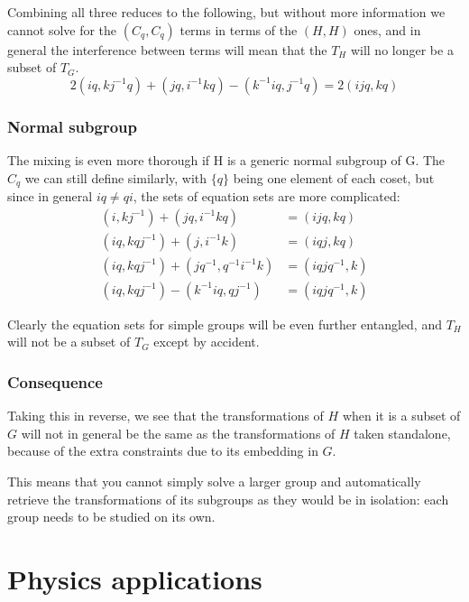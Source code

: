 \documentclass{revtex4-1}
\begin{document}
Combining all three reduces to the following, but without more information we cannot solve for
the $(C_q,C_q)$ terms in terms of the $(H,H)$ ones, and in general the interference between terms
will mean that the $T_H$ will no longer be a subset of $T_G$.
\begin{equation}
2(iq,kj^{-1}q) + (jq,i^{-1}kq) - (k^{-1}iq,j^{-1}q) = 2(ijq,kq)
\end{equation}

\subsubsection{Normal subgroup}

The mixing is even more thorough if H is a generic normal subgroup of G.  The $C_q$ we can still
define similarly, with $\{q\}$ being one element of each coset, but since in general $iq \neq qi$,
the sets of equation sets are more complicated:
\begin{align}
(i,kj^{-1}) + (jq, i^{-1}kq) &= (ijq, kq) \\ 
(iq,kqj^{-1}) + (j, i^{-1}k) &= (iqj, kq) \\
(iq,kqj^{-1}) + (jq^{-1}, q^{-1}i^{-1}k) &= (iqjq^{-1},k) \nonumber \\
(iq,kqj^{-1}) - (k^{-1}iq,qj^{-1}) &= (iqjq^{-1},k)
\end{align}

Clearly the equation sets for simple groups will be even further entangled, and $T_H$ will not
be a subset of $T_G$ except by accident.

\subsubsection{Consequence}

Taking this in reverse, we see that the transformations of $H$ when it is a subset of $G$ will
not in general be the same as the transformations of $H$ taken standalone, because of the
extra constraints due to its embedding in $G$.

\par This means that you cannot simply solve a larger group and automatically
retrieve the transformations of its subgroups as they would be in isolation:  each group
needs to be studied on its own.

\section{Physics applications}
\end{document}
